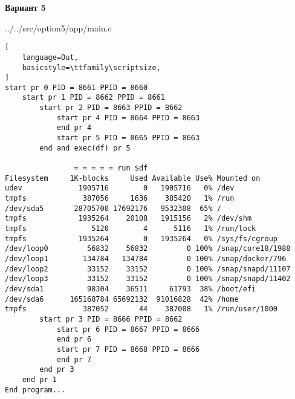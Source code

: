 \newpage

\textbf{Вариант 5}


{../../src/option5/app/main.c}

\newpage

\begin{lstlisting}[
    language=Out,
    basicstyle=\ttfamily\scriptsize,
]
start pr 0 PID = 8661 PPID = 8660
	start pr 1 PID = 8662 PPID = 8661
		start pr 2 PID = 8663 PPID = 8662
			start pr 4 PID = 8664 PPID = 8663
			end pr 4
			start pr 5 PID = 8665 PPID = 8663
		end and exec(df) pr 5

				= = = = = run $df
Filesystem     1K-blocks     Used Available Use% Mounted on
udev             1905716        0   1905716   0% /dev
tmpfs             387056     1636    385420   1% /run
/dev/sda5       28705700 17692176   9532308  65% /
tmpfs            1935264    20108   1915156   2% /dev/shm
tmpfs               5120        4      5116   1% /run/lock
tmpfs            1935264        0   1935264   0% /sys/fs/cgroup
/dev/loop0         56832    56832         0 100% /snap/core18/1988
/dev/loop1        134784   134784         0 100% /snap/docker/796
/dev/loop2         33152    33152         0 100% /snap/snapd/11107
/dev/loop3         33152    33152         0 100% /snap/snapd/11402
/dev/sda1          98304    36511     61793  38% /boot/efi
/dev/sda6      165168784 65692132  91016828  42% /home
tmpfs             387052       44    387008   1% /run/user/1000
		start pr 3 PID = 8666 PPID = 8662
			start pr 6 PID = 8667 PPID = 8666
			end pr 6
			start pr 7 PID = 8668 PPID = 8666
			end pr 7
		end pr 3
	end pr 1
End program...
\end{lstlisting}
